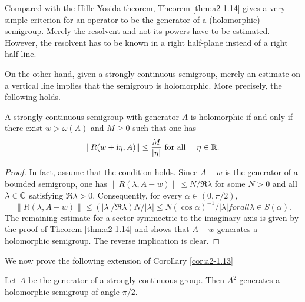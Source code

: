 Compared with the Hille-Yosida theorem, Theorem \ref{thm:a2-1.14}   gives a very simple criterion for an operator to be the generator of a (holomorphic) semigroup.
Merely the resolvent and not its powers have to be
estimated.
However, the resolvent has to be known in a right half-plane instead of a right half-line.

On the other hand, given a strongly continuous semigroup, merely an estimate on a vertical line implies that the semigroup is holomorphic.
More precisely, the following holds.
\begin{corollary*}\label{cor:a2-1.14-kgk}
A strongly continuous semigroup with generator $A$ is holomorphic if and only if there exist $w > \omega(A)$ and $M \geq 0$ such that one has
\[
    \|R(w+\mathrm{i}\eta,A)\| \leq \frac{M}{|\eta|} \text{ for all } \quad \eta \in \mathbb{R}.
\]
\end{corollary*}

\begin{proof}
In fact, assume that the condition holds.
Since $A-w$ is the generator of a bounded semigroup, one has 
$\|R(\lambda,A-w)\| \leq N/\Re\lambda$ for some $N > 0$ and all $\lambda \in \mathbb{C}$ 
satisfying $\Re\lambda > 0$.
Consequently, for every $\alpha \in (0,\pi/2)$, 
\[
\|R(\lambda,A-w)\| \leq (|\lambda|/\Re\lambda)N/|\lambda| \leq N(\cos\alpha)^{-1}/|\lambda| for all \lambda \in S(\alpha) .
\]
The remaining estimate for a sector symmectric to the imaginary axis is given by the proof of Theorem \ref{thm:a2-1.14}    
and shows that $A-w$ generates a holomorphic semigroup.
The reverse implication is clear.
\end{proof}

We now prove the following extension of Corollary \ref{cor:a2-1.13}  

\begin{theorem}\label{thm:a2-1.15}
Let $A$ be the generator of a strongly continuous group.
Then $A^2$ generates a holomorphic semigroup of angle $\pi/2$.
\end{theorem}

